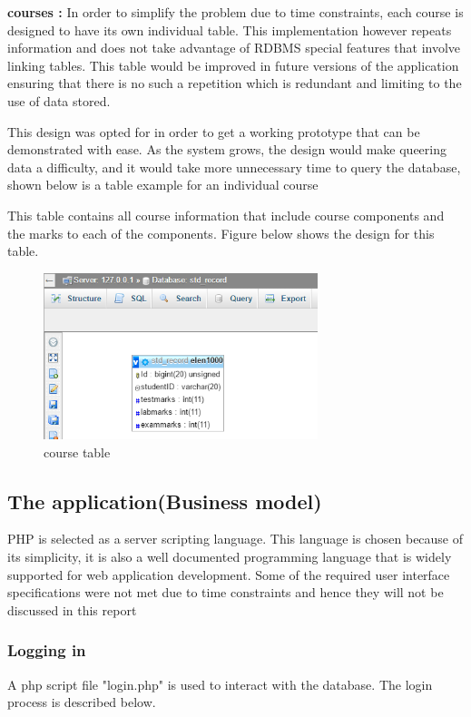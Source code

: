 \begin{itemize}
\textbf{courses : }
In order to simplify the problem due to time constraints, each course is designed to have its own individual table. This implementation however repeats information and does not take advantage of RDBMS special features that involve linking tables. This table would be improved in future versions of the application ensuring that there is no such a repetition which is redundant and limiting to the use of data stored.

This design was opted for in order to get a working prototype that can be demonstrated with ease. As the system grows, the design would make queering data a difficulty, and it would take more unnecessary time to query the database, shown below is a table example for an individual course

This table contains all course information that include course components and the marks to each of the components. Figure below shows the design for this table. 

\begin{center}
\begin{figure}[h]
\centering
\includegraphics[width=8cm]{marks}
\caption{course table}
\end{figure}
\end{center}
  
\end{itemize}

\subsection{The application(Business model)}
PHP is  selected as a server scripting language. This language is chosen because of its simplicity, it is also a well documented programming language that is widely supported for web application development. Some of the required user interface specifications were not met due to time constraints and hence they will not be discussed in this report


\subsubsection{Logging in}
A php script file "login.php" is used to interact with the database. The login process is described below.

